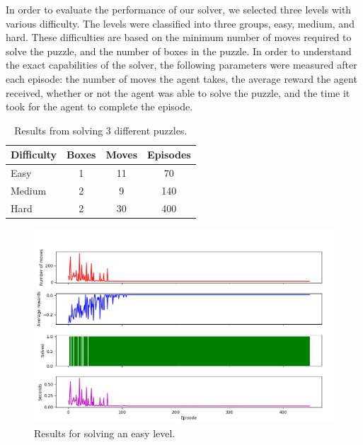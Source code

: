 \documentclass[times, 10pt,twocolumn]{article}
\begin{document}

In order to evaluate the performance of our solver, we selected three levels with various difficulty. The levels were classified into three groups, easy, medium, and hard. These difficulties are based on the minimum number of moves required to solve the puzzle, and the number of boxes in the puzzle. In order to understand the exact capabilities of the solver, the following parameters were measured after each episode: the number of moves the agent takes, the average reward the agent received, whether or not the agent was able to solve the puzzle, and the time it took for the agent to complete the episode. 

\begin{table}[htbp]
  \centering
  \begin{tabular}{l c c c} \hline\hline
    Difficulty & Boxes & Moves & Episodes \\ \hline
    Easy & 1 & 11 & 70 \\
    Medium & 2 & 9 & 140 \\
    Hard & 2 & 30 & 400 \\ \hline\hline
  \end{tabular}
  \caption{Results from solving 3 different puzzles.}
  \label{table:results}
\end{table}

\begin{figure}[h] 
  \centering
     \includegraphics[width=\linewidth]{images/easy_graph.png}
  \caption{Results for solving an easy level.}
  \label{fig:e}
\end{figure}
\end{document}
